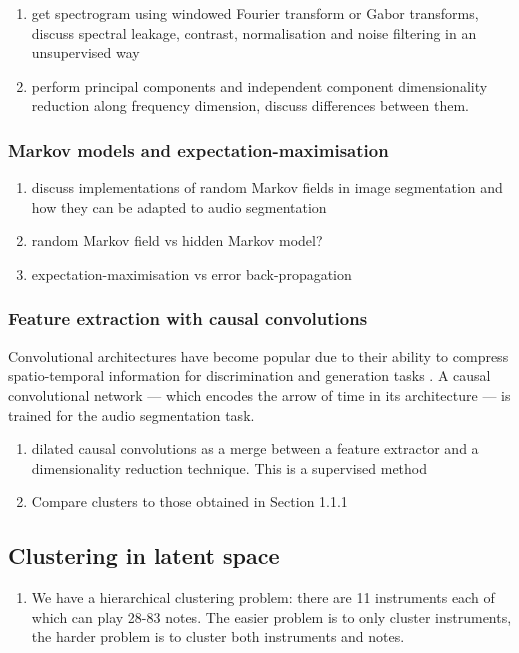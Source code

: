 \documentclass{article}[12pt]
\numberwithin{equation}{section}
\begin{document}
\begin{enumerate}
	\item get spectrogram using windowed Fourier transform or Gabor transforms,
	discuss spectral leakage, contrast, normalisation and noise filtering in an
	unsupervised way
	\item perform principal components and independent component dimensionality
	reduction along frequency dimension, discuss differences between them.
\end{enumerate}
\subsubsection{Markov models and expectation-maximisation}
\begin{enumerate}
	\item discuss implementations of random Markov fields in image segmentation
	and how they can be adapted to audio segmentation
	\item random Markov field vs hidden Markov model?
	\item expectation-maximisation vs error back-propagation
\end{enumerate}
\subsubsection{Feature extraction with causal convolutions}
Convolutional architectures have become popular due to their ability to compress spatio-temporal
information for discrimination and generation tasks \cite{Oord2016a,Goodfellow}.
A causal convolutional network \cite{Oord2016} --- which encodes the arrow of time in
its architecture --- is trained for the audio segmentation task.
\begin{enumerate}
	\item dilated causal convolutions as a merge between a feature
	extractor and a dimensionality reduction technique. This is a supervised method
	\item Compare clusters to those obtained in Section 1.1.1
\end{enumerate}
\subsection{Clustering in latent space}
\begin{enumerate}
	\item We have a hierarchical clustering problem: there are 11 instruments each
	of which can play 28-83 notes. The easier problem is to only cluster instruments,
	the harder problem is to cluster both instruments and notes.
\end{enumerate}
\end{document}
